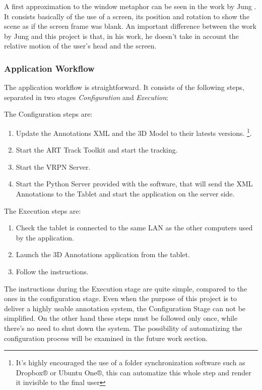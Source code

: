 A first approximation to the window metaphor can be seen in the work by Jung \cite{Jung}. It consists basically of the use of a screen, its position and rotation to show the scene as if the screen frame was blank. An important difference between the work by Jung and this project is that, in his work, he doesn't take in account the relative motion of the user's head and the screen.


\subsubsection{Application Workflow}

The application workflow is straightforward. It consists of the following steps, separated in two stages \emph{Configuration} and \emph{Execution}:

The Configuration steps are:
\begin{enumerate}
\item Update the Annotations XML and the 3D Model to their latests versions. \footnote{It's highly encouraged the use of a folder synchronization software such as Dropbox® or Ubuntu One®, this can automatize this whole step and render it invisible to the final user}.
\item Start the ART Track Toolkit and start the tracking.
\item Start the VRPN Server.
\item Start the Python Server provided with the software, that will send the XML Annotations to the Tablet and start the application on the server side.
\end{enumerate}

The Execution steps are:
\begin{enumerate}
\item Check the tablet is connected to the same LAN as the other computers used by the application.
\item Launch the 3D Annotations application from the tablet.
\item Follow the instructions.
\end{enumerate}

The instructions during the Execution stage are quite simple, compared to the ones in the configuration stage. Even when the purpose of this project is to deliver a highly usable annotation system, the Configuration Stage can not be simplified. On the other hand these steps must be followed only once, while there's no need to shut down the system. The possibility of automatizing the configuration process will be examined in the future work section.

